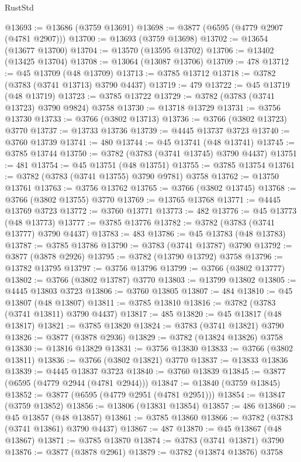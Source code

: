 \begin{lexlean}{RustStd}
\begin{coremodule}
@13693 := @13686 (@3759 @13691)
@13698 := @3877 (@6595 (@4779 @2907 (@4781 @2907)))
@13700 := @13693 (@3759 @13698)
@13702 := @13654 (@13677 @13700)
@13704 := @13570 (@13595 @13702)
@13706 := @13402 (@13425 @13704)
@13708 := @13064 (@13087 @13706)
@13709 := 478
@13712 := @45 @13709 (@48 @13709)
@13713 := @3785 @13712
@13718 := @3782 (@3783 (@3741 @13713) @3790 @4437)
@13719 := 479
@13722 := @45 @13719 (@48 @13719)
@13723 := @3785 @13722
@13729 := @3782 (@3783 (@3741 @13723) @3790 @9824) @3758
@13730 := @13718 @13729
@13731 := @3756 @13730
@13733 := @3766 (@3802 @13713)
@13736 := @3766 (@3802 @13723) @3770
@13737 := @13733 @13736
@13739 := @4445 @13737 @3723
@13740 := @3760 @13739
@13741 := 480
@13744 := @45 @13741 (@48 @13741)
@13745 := @3785 @13744
@13750 := @3782 (@3783 (@3741 @13745) @3790 @4437)
@13751 := 481
@13754 := @45 @13751 (@48 @13751)
@13755 := @3785 @13754
@13761 := @3782 (@3783 (@3741 @13755) @3790 @9781) @3758
@13762 := @13750 @13761
@13763 := @3756 @13762
@13765 := @3766 (@3802 @13745)
@13768 := @3766 (@3802 @13755) @3770
@13769 := @13765 @13768
@13771 := @4445 @13769 @3723
@13772 := @3760 @13771
@13773 := 482
@13776 := @45 @13773 (@48 @13773)
@13777 := @3785 @13776
@13782 := @3782 (@3783 (@3741 @13777) @3790 @4437)
@13783 := 483
@13786 := @45 @13783 (@48 @13783)
@13787 := @3785 @13786
@13790 := @3783 (@3741 @13787) @3790
@13792 := @3877 (@3878 @2926)
@13795 := @3782 (@13790 @13792) @3758
@13796 := @13782 @13795
@13797 := @3756 @13796
@13799 := @3766 (@3802 @13777)
@13802 := @3766 (@3802 @13787) @3770
@13803 := @13799 @13802
@13805 := @4445 @13803 @3723
@13806 := @3760 @13805
@13807 := 484
@13810 := @45 @13807 (@48 @13807)
@13811 := @3785 @13810
@13816 := @3782 (@3783 (@3741 @13811) @3790 @4437)
@13817 := 485
@13820 := @45 @13817 (@48 @13817)
@13821 := @3785 @13820
@13824 := @3783 (@3741 @13821) @3790
@13826 := @3877 (@3878 @2936)
@13829 := @3782 (@13824 @13826) @3758
@13830 := @13816 @13829
@13831 := @3756 @13830
@13833 := @3766 (@3802 @13811)
@13836 := @3766 (@3802 @13821) @3770
@13837 := @13833 @13836
@13839 := @4445 @13837 @3723
@13840 := @3760 @13839
@13845 := @3877 (@6595 (@4779 @2944 (@4781 @2944)))
@13847 := @13840 (@3759 @13845)
@13852 := @3877 (@6595 (@4779 @2951 (@4781 @2951)))
@13854 := @13847 (@3759 @13852)
@13856 := @13806 (@13831 @13854)
@13857 := 486
@13860 := @45 @13857 (@48 @13857)
@13861 := @3785 @13860
@13866 := @3782 (@3783 (@3741 @13861) @3790 @4437)
@13867 := 487
@13870 := @45 @13867 (@48 @13867)
@13871 := @3785 @13870
@13874 := @3783 (@3741 @13871) @3790
@13876 := @3877 (@3878 @2961)
@13879 := @3782 (@13874 @13876) @3758

\end{coremodule}
\end{lexlean}

